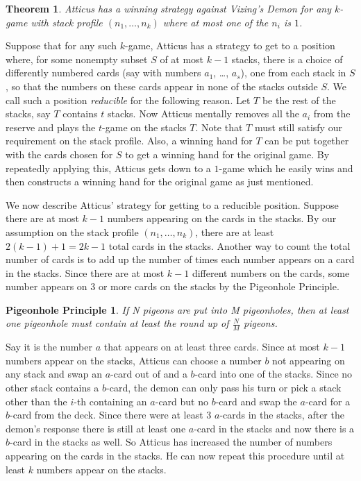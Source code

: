 \documentclass[12pt]{article}
\theoremstyle{plain}
\newtheorem{thm}{Theorem}
\newtheorem*{pigeonhole}{Pigeonhole Principle}
\theoremstyle{definition}
\theoremstyle{remark}
\newcommand{\parens}[1]{\left( #1 \right)}
\begin{document}
\begin{thm}
Atticus has a winning strategy against Vizing's Demon for any $k$-game with stack profile $\parens{n_1, \ldots, n_k}$ where at most one of the $n_i$ is $1$.
\end{thm}

Suppose that for any such $k$-game, Atticus has a strategy to get to a position where, for some nonempty subset $S$ of at most $k-1$ stacks, there is a choice of differently numbered cards (say with numbers $a_1$, \ldots, $a_s$), one from each stack in $S$, so that the numbers on these cards appear in none of the stacks outside $S$. We call such a position \emph{reducible} for the following reason. Let $T$ be the rest of the stacks, say $T$ contains $t$ stacks.  Now Atticus mentally removes all the $a_i$ from the reserve and plays the $t$-game on the stacks $T$.  Note that $T$ must still satisfy our requirement on the stack profile.  Also, a winning hand for $T$ can be put together with the cards chosen for $S$ to get a winning hand for the original game. By repeatedly applying this, Atticus gets down to a $1$-game which he easily wins and then constructs a winning hand for the original game as just mentioned.

We now describe Atticus' strategy for getting to a reducible position. Suppose there are at most $k-1$ numbers appearing on the cards in the stacks.  By our assumption on the stack profile $\parens{n_1, \ldots, n_k}$, there are at least $2(k-1) + 1 = 2k-1$ total cards in the stacks.  Another way to count the total number of cards is to add up the number of times each number appears on a card in the stacks.  Since there are at most $k-1$ different numbers on the cards, some number appears on $3$ or more cards on the stacks by the Pigeonhole Principle.

\begin{pigeonhole}
If N pigeons are put into M pigeonholes, then at least one pigeonhole must contain at least the round up of $\frac{N}{M}$ pigeons.
\end{pigeonhole}

Say it is the number $a$ that appears on at least three cards.  Since at most $k-1$ numbers appear on the stacks, Atticus can choose a number $b$ not appearing on any stack and swap an $a$-card out of and a $b$-card into one of the stacks.  Since no other stack contains a $b$-card, the demon can only pass his turn or pick a stack other than the $i$-th containing an $a$-card but no $b$-card and swap the $a$-card for a $b$-card from the deck.  Since there were at least $3$ $a$-cards in the stacks, after the demon's response there is still at least one $a$-card in the stacks and now there is a $b$-card in the stacks as well.  So Atticus has increased the number of numbers appearing on the cards in the stacks.  He can now repeat this procedure until at least $k$ numbers appear on the stacks.
\end{document}
